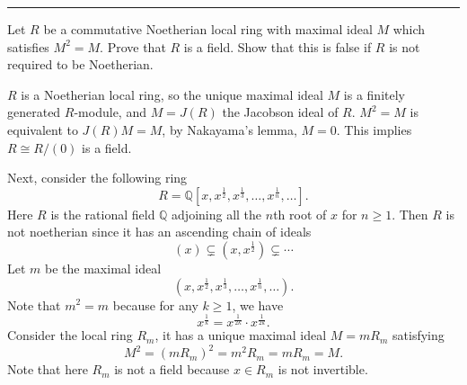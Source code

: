 \documentclass[letterpaper, 12pt]{article}
\begin{document}
\noindent\rule{7in}{2.8pt}
\begin{problem}{3}
Let \(R\) be a commutative Noetherian local ring with maximal ideal \(M\) which satisfies \(M^2=M\). Prove that \(R\) is a field. Show that this is false if \(R\) is not required to be Noetherian.
\end{problem}
\begin{solution}
\(R\) is a Noetherian local ring, so the unique maximal ideal \(M\) is a finitely generated \(R\)-module, and \(M=J(R)\) the Jacobson ideal of \(R\). \(M^2=M\) is equivalent to \(J(R)M=M\), by Nakayama's lemma, \(M=0\). This implies \(R\cong R/(0)\) is a field. 

Next, consider the following ring 
\[R=\mathbb{Q}[x,x^\frac{1}{2},x^\frac{1}{3},\ldots,x^\frac{1}{n},\ldots].\]
Here \(R\) is the rational field \(\mathbb{Q}\) adjoining all the \(n\)th root of \(x\) for \(n\geq 1\). Then \(R\) is not noetherian since it has an ascending chain of ideals
\[(x)\subsetneq (x,x^\frac{1}{2})\subsetneq \cdots\]
Let \(m\) be the maximal ideal 
\[(x,x^\frac{1}{2},x^\frac{1}{3},\ldots,x^\frac{1}{n},\ldots).\]
Note that \(m^2=m\) because for any \(k\geq 1\), we have 
\[x^\frac{1}{k}=x^\frac{1}{2k}\cdot x^\frac{1}{2k}.\]
Consider the local ring \(R_m\), it has a unique maximal ideal \(M=mR_m\) satisfying 
\[M^2=(mR_m)^2=m^2R_m=mR_m=M.\]
Note that here \(R_m\) is not a field because \(x\in R_m\) is not invertible. 
\end{solution}
\end{document}
